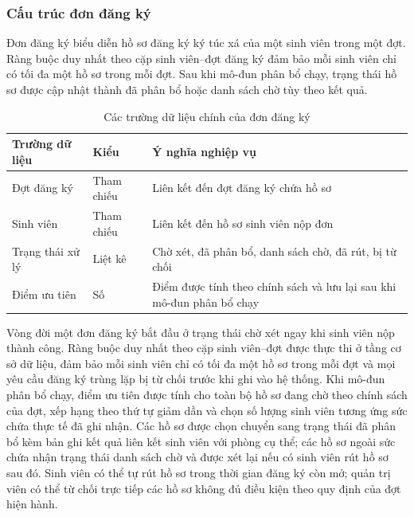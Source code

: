 \documentclass[../DoAn.tex]{subfiles}
\begin{document}
\subsubsection{Cấu trúc đơn đăng ký}

Đơn đăng ký biểu diễn hồ sơ đăng ký ký túc xá của một sinh viên trong một
đợt. Ràng buộc duy nhất theo cặp sinh viên--đợt đăng ký đảm bảo mỗi sinh viên
chỉ có tối đa một hồ sơ trong mỗi đợt. Sau khi mô-đun phân bổ chạy, trạng thái
hồ sơ được cập nhật thành đã phân bổ hoặc danh sách chờ tùy theo kết quả.

\vspace{-6pt}
\begin{table}[H]
\centering
\caption{Các trường dữ liệu chính của đơn đăng ký}
\label{tab:class_reg_attr}
\small
\begin{tabular}{|>{\raggedright\arraybackslash}p{4.4cm}|>{\raggedright\arraybackslash}p{2.0cm}|>{\raggedright\arraybackslash}p{7.0cm}|}
\hline
\textbf{Trường dữ liệu} & \textbf{Kiểu} & \textbf{Ý nghĩa nghiệp vụ} \\
\hline
Đợt đăng ký & Tham chiếu & Liên kết đến đợt đăng ký chứa hồ sơ \\
\hline
Sinh viên & Tham chiếu & Liên kết đến hồ sơ sinh viên nộp đơn \\
\hline
Trạng thái xử lý & Liệt kê & Chờ xét, đã phân bổ, danh sách chờ, đã rút, bị từ chối \\
\hline
Điểm ưu tiên & Số & Điểm được tính theo chính sách và lưu lại sau khi mô-đun phân bổ chạy \\
\hline
\end{tabular}
\end{table}
\vspace{-4pt}

Vòng đời một đơn đăng ký bắt đầu ở trạng thái chờ xét ngay khi sinh viên nộp
thành công. Ràng buộc duy nhất theo cặp sinh viên--đợt được thực thi ở tầng cơ
sở dữ liệu, đảm bảo mỗi sinh viên chỉ có tối đa một hồ sơ trong mỗi đợt và
mọi yêu cầu đăng ký trùng lặp bị từ chối trước khi ghi vào hệ thống. Khi
mô-đun phân bổ chạy, điểm ưu tiên được tính cho toàn bộ hồ sơ đang chờ theo
chính sách của đợt, xếp hạng theo thứ tự giảm dần và chọn số lượng sinh viên
tương ứng sức chứa thực tế đã ghi nhận. Các hồ sơ được chọn chuyển sang trạng
thái đã phân bổ kèm bản ghi kết quả liên kết sinh viên với phòng cụ thể; các
hồ sơ ngoài sức chứa nhận trạng thái danh sách chờ và được xét lại nếu có sinh
viên rút hồ sơ sau đó. Sinh viên có thể tự rút hồ sơ trong thời gian đăng ký
còn mở; quản trị viên có thể từ chối trực tiếp các hồ sơ không đủ điều kiện
theo quy định của đợt hiện hành.
\end{document}
